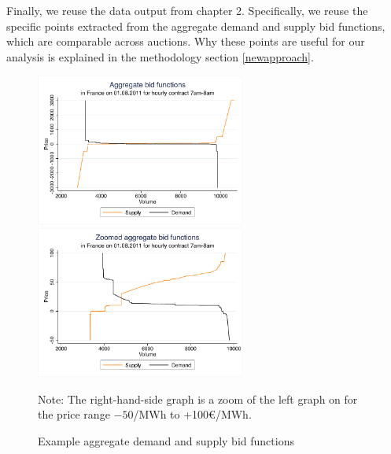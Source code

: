 Finally, we reuse the data output from chapter 2. Specifically, we reuse the specific points extracted from the aggregate demand and supply bid functions, which are comparable across auctions. Why these points are useful for our analysis is explained in the methodology section \ref{newapproach}.

\begin{figure}[!ht]
\begin{center} \includegraphics[height=50mm]{figch2/aggbidfuncnozoom.pdf} \hspace{0.05cm}\includegraphics[height=50mm]{figch2/aggbidfuncwithzoom.pdf} \end{center}
\caption{Example aggregate demand and supply bid functions}
\label{examplebidfunc}
{\small Note: The right-hand-side graph is a zoom of the left graph on for the price range  $-50$\EUR{}/MWh  to +100\euro /MWh.}
\end{figure}


